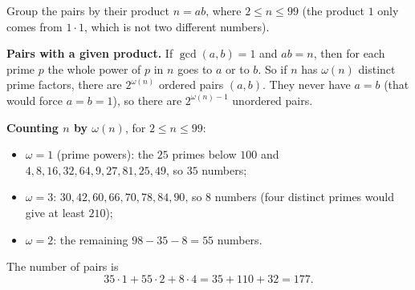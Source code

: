 Group the pairs by their product $n=ab$, where $2\le n\le99$ (the product $1$ only comes from $1\cdot1$, which is not two different numbers).

\textbf{Pairs with a given product.} If $\gcd(a,b)=1$ and $ab=n$, then for each prime $p$ the whole power of $p$ in $n$ goes to $a$ or to $b$. So if $n$ has $\omega(n)$ distinct prime factors, there are $2^{\omega(n)}$ ordered pairs $(a,b)$. They never have $a=b$ (that would force $a=b=1$), so there are $2^{\omega(n)-1}$ unordered pairs.

\textbf{Counting $n$ by $\omega(n)$}, for $2\le n\le99$:
\begin{itemize}
\item $\omega=1$ (prime powers): the $25$ primes below $100$ and $4,8,16,32,64,9,27,81,25,49$, so $35$ numbers;
\item $\omega=3$: $30,42,60,66,70,78,84,90$, so $8$ numbers (four distinct primes would give at least $210$);
\item $\omega=2$: the remaining $98-35-8=55$ numbers.
\end{itemize}
The number of pairs is
\[35\cdot1+55\cdot2+8\cdot4=35+110+32=\boxed{177}.\]
